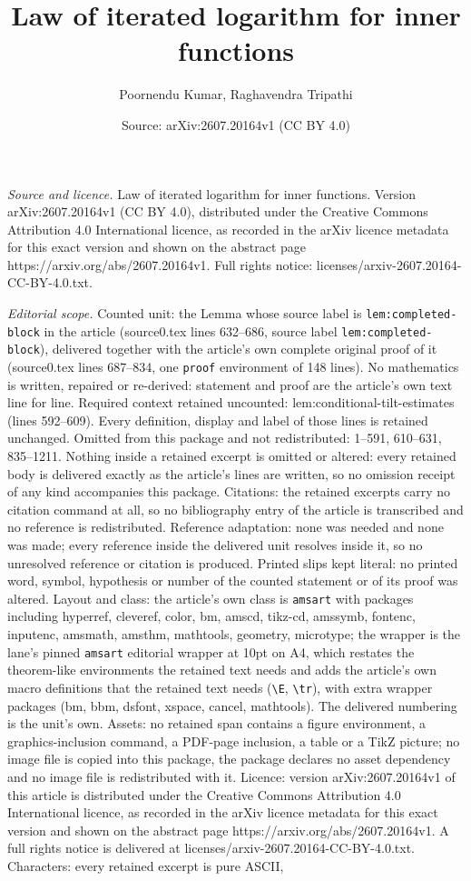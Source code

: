 \documentclass[10pt,a4paper]{amsart}
\title[Law of iterated logarithm for inner functions]{Law of iterated logarithm for inner functions}
\author{Poornendu Kumar, Raghavendra Tripathi}
\date{Source: arXiv:2607.20164v1 (CC BY 4.0)}
\begin{document}
\maketitle

\noindent\emph{Source and licence.} Law of iterated logarithm for inner functions. Version arXiv:2607.20164v1 (CC BY 4.0), distributed under the Creative Commons Attribution 4.0 International licence, as recorded in the arXiv licence metadata for this exact version and shown on the abstract page https://arxiv.org/abs/2607.20164v1. Full rights notice: licenses/arxiv-2607.20164-CC-BY-4.0.txt.\par\smallskip

\noindent\textit{Editorial scope.} Counted unit: the Lemma whose source label is \texttt{lem:completed-block} in the article (source0.tex lines 632--686, source label \texttt{lem:completed-block}), delivered together with the article's own complete original proof of it (source0.tex lines 687--834, one \texttt{proof} environment of 148 lines). No mathematics is written, repaired or re-derived: statement and proof are the article's own text line for line. Required context retained uncounted: lem:conditional-tilt-estimates (lines 592--609). Every definition, display and label of those lines is retained unchanged. Omitted from this package and not redistributed: 1--591, 610--631, 835--1211. Nothing inside a retained excerpt is omitted or altered: every retained body is delivered exactly as the article's lines are written, so no omission receipt of any kind accompanies this package. Citations: the retained excerpts carry no citation command at all, so no bibliography entry of the article is transcribed and no reference is redistributed. Reference adaptation: none was needed and none was made; every reference inside the delivered unit resolves inside it, so no unresolved reference or citation is produced. Printed slips kept literal: no printed word, symbol, hypothesis or number of the counted statement or of its proof was altered. Layout and class: the article's own class is \texttt{amsart} with packages including hyperref, cleveref, color, bm, amscd, tikz-cd, amssymb, fontenc, inputenc, amsmath, amsthm, mathtools, geometry, microtype; the wrapper is the lane's pinned \texttt{amsart} editorial wrapper at 10pt on A4, which restates the theorem-like environments the retained text needs and adds the article's own macro definitions that the retained text needs (\texttt{\textbackslash E}, \texttt{\textbackslash tr}), with extra wrapper packages (bm, bbm, dsfont, xspace, cancel, mathtools). The delivered numbering is the unit's own. Assets: no retained span contains a figure environment, a graphics-inclusion command, a PDF-page inclusion, a table or a TikZ picture; no image file is copied into this package, the package declares no asset dependency and no image file is redistributed with it. Licence: version arXiv:2607.20164v1 of this article is distributed under the Creative Commons Attribution 4.0 International licence, as recorded in the arXiv licence metadata for this exact version and shown on the abstract page https://arxiv.org/abs/2607.20164v1. A full rights notice is delivered at licenses/arxiv-2607.20164-CC-BY-4.0.txt. Characters: every retained excerpt is pure ASCII, 
\end{document}
